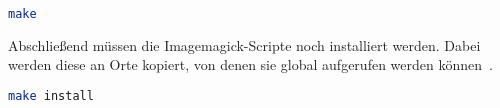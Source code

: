 \begin{lstlisting}[language=Bash, caption=Imagemagick Installation: make Befehl,label={lst:installmake}]
make
\end{lstlisting}
\vspace{5mm}

Abschließend müssen die Imagemagick-Scripte noch installiert werden.
Dabei werden diese an Orte kopiert, von denen sie global aufgerufen werden können~\cite{HowInstallImageMagick}.

\begin{lstlisting}[language=Bash, caption=Imagmagick Installation: make install Befehl,label={lst:installmakeinstall}]
make install
\end{lstlisting}
\vspace{5mm}